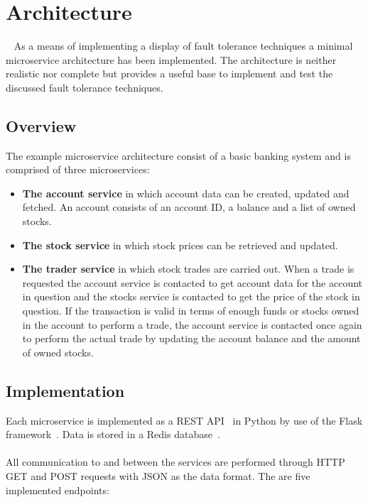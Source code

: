 \section{Architecture}~\label{sec:architecture}
As a means of implementing a display of fault tolerance techniques a
minimal microservice architecture has been implemented. The
architecture is neither realistic nor complete but provides a useful
base to implement and test the discussed fault tolerance techniques.

\subsection{Overview}
The example microservice architecture consist of a basic banking
system and is comprised of three microservices:

\begin{itemize}
\item \textbf{The account service} in which account data can be
  created, updated and fetched. An account consists of an account ID,
  a balance and a list of owned stocks.
\item \textbf{The stock service} in which stock prices can be
  retrieved and updated.
\item \textbf{The trader service} in which stock trades are carried
  out. When a trade is requested the account service is contacted to
  get account data for the account in question  and the stocks service
  is contacted to get the price of the stock in question. If the
  transaction is valid in terms of enough funds or stocks owned in the
  account to perform a trade, the account service is contacted once
  again to perform the actual trade by updating the account balance
  and the amount of owned stocks.
\end{itemize}

\subsection{Implementation}
Each microservice is implemented as a REST
API~\cite{fielding2000dissertation} in Python by use of the Flask
framework~\cite{flask}. Data is stored in a Redis database~\cite{redis}.
\\\\
All communication to and between the services are performed through
HTTP GET and POST requests with JSON as the data format. The are five
implemented endpoints:

